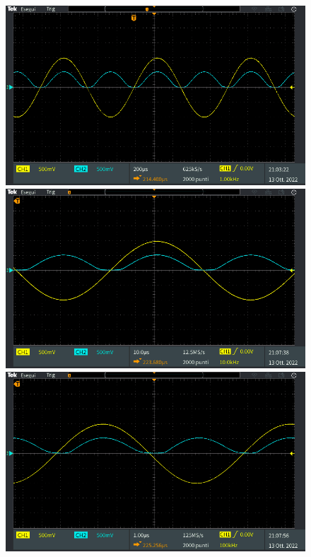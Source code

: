 \begin{figure}[!h]
	\centering
	\begin{minipage}{.496\textwidth}
		\includegraphics[width=\linewidth]{./ImageFiles/Laboratorio 2/TEK00041.PNG}
	\end{minipage}
	\begin{minipage}{.496\textwidth}
		\includegraphics[width=\linewidth]{./ImageFiles/Laboratorio 2/TEK00046.PNG}
	\end{minipage}
	\begin{minipage}{.496\textwidth}
		\includegraphics[width=\linewidth]{./ImageFiles/Laboratorio 2/TEK00047.PNG}

\end{minipage}
\end{figure}
